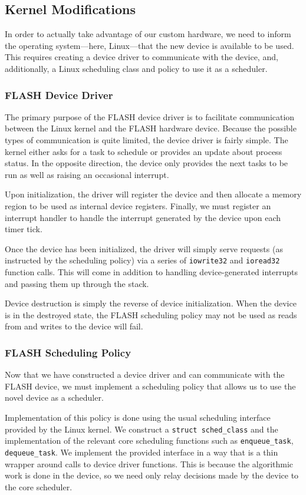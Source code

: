 \documentclass{sig-alternate-10pt}
\begin{document}
\subsection{Kernel Modifications}
In order to actually take advantage of our custom hardware, we need to
inform the operating system---here, Linux---that the new device is available
to be used.  This requires creating a device driver to communicate with the
device, and, additionally, a Linux scheduling class and policy to use it as
a scheduler.

\subsubsection{FLASH Device Driver}
The primary purpose of the FLASH device driver is to facilitate
communication between the Linux kernel and the FLASH hardware device.
Because the possible types of communication is quite limited, the device
driver is fairly simple.  The kernel either asks for a task to schedule or
provides an update about process status.  In the opposite direction, the
device only provides the next tasks to be run as well as raising an
occasional interrupt.

Upon initialization, the driver will register the device and then allocate
a memory region to be used as internal device registers.  Finally, we must
register an interrupt handler to handle the interrupt generated by the
device upon each timer tick.

Once the device has been initialized, the driver will simply serve requests
(as instructed by the scheduling policy) via a series of \texttt{iowrite32}
and \texttt{ioread32} function calls.  This will come in addition to
handling device-generated interrupts and passing them up through the stack.

Device destruction is simply the reverse of device initialization.  When the
device is in the destroyed state, the FLASH scheduling policy may not be
used as reads from and writes to the device will fail.

\subsubsection{FLASH Scheduling Policy}
Now that we have constructed a device driver and can communicate with the
FLASH device, we must implement a scheduling policy that allows us to use
the novel device as a scheduler.

Implementation of this policy is done using the usual scheduling interface
provided by the Linux kernel.  We construct a \texttt{struct sched\_class}
and the implementation of the relevant core scheduling functions such as
\texttt{enqueue\_task}, \texttt{dequeue\_task}.  We implement the provided
interface in a way that is a thin wrapper around calls to device driver
functions.  This is because the algorithmic work is done in the device, so
we need only relay decisions made by the device to the core scheduler.
\end{document}
